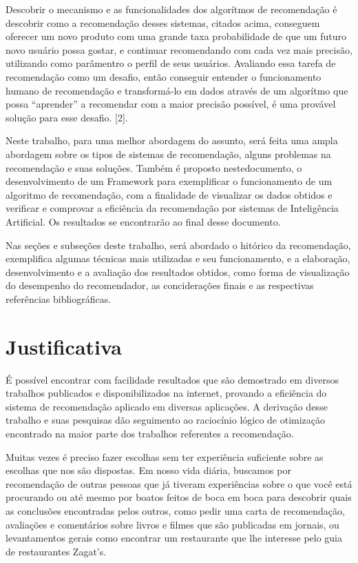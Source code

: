 \documentclass[12pt,
				openright,
				twoside,
				a4paper,
				apter=TITLE,
				section=TITLE,
				subsection=TITLE,
				chapter=TITLE,
				english,
				french,
				spanish,
				brazil]{abntex2}
\begin{document}
Descobrir o mecanismo e as funcionalidades dos algorítmos de recomendação é descobrir como a recomendação desses sistemas, citados acima, conseguem oferecer um novo produto com uma grande taxa probabilidade de que um futuro novo usuário possa gostar, e continuar recomendando com cada vez mais precisão, utilizando como parâmentro o perfil de seus usuários. Avaliando essa tarefa de recomendação como um desafio, então conseguir entender o funcionamento humano de recomendação e transformá-lo em dados através de um algorítmo que possa ``aprender'' a recomendar com a maior precisão possível, é uma provável solução para esse desafio. [2].

Neste trabalho, para uma melhor abordagem do assunto, será feita uma ampla abordagem sobre os tipos de sistemas de recomendação, alguns problemas na recomendação e suas soluções. Também é proposto nestedocumento, o desenvolvimento de um Framework para exemplificar o funcionamento de um algoritmo de recomendação, com a finalidade de visualizar os dados obtidos e verificar e comprovar a eficiência da recomendação por sistemas de Inteligência Artificial. Os resultados se encontrarão ao final desse documento.

Nas seções e subseções deste trabalho, será abordado o hitórico da recomendação, exemplifica algumas técnicas mais utilizadas e seu funcionamento, e a elaboração, desenvolvimento e a avaliação dos resultados obtidos, como forma de visualização do desempenho do recomendador, as conciderações finais e as respectivas referências bibliográficas. 

\section{Justificativa}
É possível encontrar com facilidade resultados que são demostrado em diversos trabalhos publicados e disponibilizados na internet, provando a eficiência do sistema de recomendação aplicado em diversas aplicações. A derivação desse trabalho e suas pesquisas dão seguimento ao raciocínio lógico de otimização encontrado na maior parte dos trabalhos referentes a recomendação. 

\begin{citacao}
Muitas vezes é preciso fazer escolhas sem ter experiência suficiente sobre as escolhas que nos são dispostas. Em nosso vida diária, buscamos por recomendação de outras pessoas que já tiveram experiências sobre o que você está procurando ou até mesmo por boatos feitos de boca em boca para descobrir quais as conclusões encontradas pelos outros, como pedir uma carta de recomendação, avaliações e comentários sobre livros e filmes que são publicadas em jornais, ou levantamentos gerais como encontrar um restaurante que lhe interesse pelo guia de restaurantes Zagat’s.
\cite{resnick1997recommender}
\end{citacao}
\end{document}
